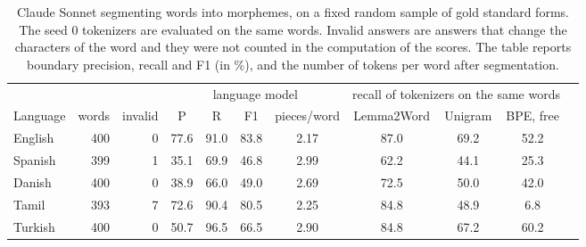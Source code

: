 \begin{table}[!ht]
\centering
\caption{Claude Sonnet segmenting words into morphemes, on a fixed random sample of gold standard forms. The seed 0 tokenizers are evaluated on the same words. Invalid answers are answers that change the characters of the word and they were not counted in the computation of the scores. The table reports boundary precision, recall and F1 (in \%), and the number of tokens per word after segmentation.}
\label{tab:llm}
\small
\setlength{\tabcolsep}{3.5pt}
\begin{tabular}{lrrcccccccc}
\toprule
 & & & \multicolumn{4}{c}{language model} & \multicolumn{3}{c}{recall of tokenizers on the same words} \\
\cmidrule(lr){4-7}\cmidrule(lr){8-10}
Language & words & invalid & P & R & F1 & pieces/word & Lemma2Word & Unigram & BPE, free \\
\midrule
English & 400 & 0 & 77.6 & 91.0 & 83.8 & 2.17 & 87.0 & 69.2 & 52.2 \\
Spanish & 399 & 1 & 35.1 & 69.9 & 46.8 & 2.99 & 62.2 & 44.1 & 25.3 \\
Danish & 400 & 0 & 38.9 & 66.0 & 49.0 & 2.69 & 72.5 & 50.0 & 42.0 \\
Tamil & 393 & 7 & 72.6 & 90.4 & 80.5 & 2.25 & 84.8 & 48.9 & 6.8 \\
Turkish & 400 & 0 & 50.7 & 96.5 & 66.5 & 2.90 & 84.8 & 67.2 & 60.2 \\
\bottomrule
\end{tabular}
\end{table}
